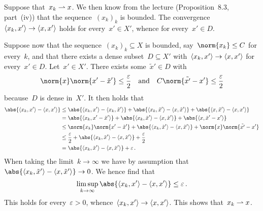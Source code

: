\section{}





\subsection{}

Suppose that~$x_k \rightharpoonup x$.
We then know from the lecture (Proposition~8.3, part~(iv)) that the sequence~$(x_k)_k$ is bounded.
The convergence~$\langle x_k, x'\rangle \to \langle x, x'\rangle$ holds for every~$x' \in X'$, whence for every~$x' \in D$.

Suppose now that the sequence~$(x_k)_k \subseteq X$ is bounded, say~$\norm{x_k} \leq C$ for every~$k$, and that there exists a dense subset~$D \subseteq X'$ with~$\langle x_k, x'\rangle \to \langle x, x'\rangle$ for every~$x' \in D$.
Let~$x' \in X'$.
There exists some~$\tilde{x}' \in D$ with
\[
  \norm{x} \norm{x' - \tilde{x}'} \leq \frac{\varepsilon}{2}
  \quad\text{and}\quad
  C \norm{\tilde{x'} - x'} \leq \frac{\varepsilon}{2}
\]
because~$D$ is dense in~$X'$.
It then holds that
\begin{align*}
  \abs{ \bil{x_k, x'} - \bil{x, x'} }
  &\leq
    \abs{ \bil{x_k, x'} - \bil{x_k, \tilde{x}'} }
  + \abs{ \bil{x_k, \tilde{x}'} - \bil{x, \tilde{x}'} }
  + \abs{ \bil{x, \tilde{x}'} - \bil{x, x'} } \\
  &=
      \abs{ \bil{x_k, x' - \tilde{x}' } }
    + \abs{ \bil{x_k, \tilde{x}'} - \bil{x, \tilde{x}' } }
    + \abs{ \bil{x, \tilde{x}' - x' } } \\
  &\leq
      \norm{x_k} \norm{x' - \tilde{x}'}
    + \abs{ \bil{x_k, \tilde{x}'} - \bil{x, \tilde{x}' } }
    + \norm{x} \norm{\tilde{x'} - x'} \\
  &\leq
      \frac{\varepsilon}{2}
    + \abs{ \bil{x_k, \tilde{x}'} - \bil{x, \tilde{x}' } }
    + \frac{\varepsilon}{2} \\
  &=  \abs{ \bil{x_k, \tilde{x}'} - \bil{x, \tilde{x}' } }
    + \varepsilon \,.
\end{align*}
When taking the limit~$k \to \infty$ we have by assumption that~$\abs{ \bil{x_k, \tilde{x}'} - \bil{x, \tilde{x}' } } \to 0$.
We hence find that
\[
        \limsup_{k \to \infty} \abs{ \bil{x_k, x'} - \bil{x, x'} }
  \leq  \varepsilon \,.
\]
This holds for every~$\varepsilon > 0$, whence~$\langle x_k, x'\rangle \to \langle x,x'\rangle$.
This shows that~$x_k \rightharpoonup x$.






